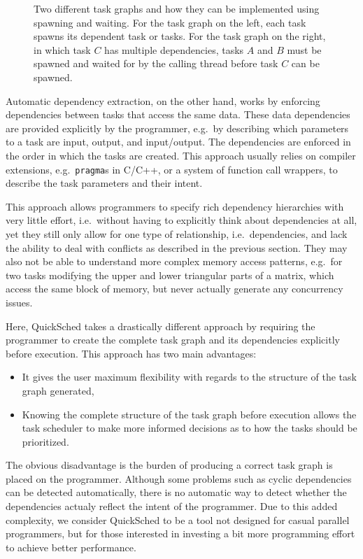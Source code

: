 \documentclass[fleqn,10pt]{wlpeerj}
\begin{document}
\begin{figure}
    \centerline{}
    \caption{Two different task graphs and how they can be implemented
      using spawning and waiting.
      For the task graph on the left, each task spawns its dependent
      task or tasks. For the task graph on the right, in which task $C$
      has multiple dependencies, tasks $A$ and $B$ must be spawned and waited
      for by the calling thread before task $C$ can be spawned.}
    \label{fig:Spawn}
\end{figure}

Automatic dependency extraction, on the other hand,
works by enforcing dependencies
between tasks that access the same data.
These data dependencies are provided explicitly by the programmer, e.g.~by
describing which parameters to a task are input, output, and input/output.
The dependencies are enforced in the order in which the tasks are 
created.
This approach usually relies on compiler extensions, e.g.~{\tt pragma}s
in C/C++, or a system of function call wrappers, to describe the task parameters
and their intent.

This approach allows programmers to specify rich dependency hierarchies
with very little effort, i.e.~without having to explicitly think about
dependencies at all, yet they still only allow for one type of relationship,
i.e.~dependencies, and lack the ability to deal with conflicts as
described in the previous section.
They may also not be able to understand more complex memory access patterns,
e.g.~for two tasks modifying the upper and lower triangular parts of a matrix,
which access the same block of memory, but never actually generate any
concurrency issues.


Here, QuickSched takes a drastically different approach by requiring
the programmer to create the complete task graph and its dependencies
explicitly before execution.
This approach has two main advantages:
\begin{itemize}
  \item It gives the user maximum flexibility with regards to the
    structure of the task graph generated,
  \item Knowing the complete structure of the task graph before execution
    allows the task scheduler to make more informed decisions
    as to how the tasks should be prioritized.
\end{itemize}

\noindent The obvious disadvantage is the burden of producing a correct
task graph is placed on the programmer.
Although some problems such as cyclic dependencies can be detected
automatically, there is no automatic way to detect whether the
dependencies actualy reflect the intent of the programmer.
Due to this added complexity, we consider QuickSched to be
a tool not designed for casual parallel programmers, but for 
those interested in investing a bit more programming effort to achieve
better performance.
\end{document}
